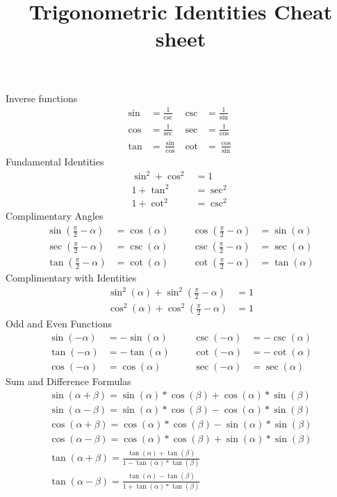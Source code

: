 \documentclass{article}
\title{\vspace{-5ex}Trigonometric Identities Cheat sheet  \vspace{-5ex}}
\author{}
\date{}
\newcommand{\nine}{\frac{\pi}{2}}
\renewcommand{\a}{\alpha}
\renewcommand{\b}{\beta}
\begin{document}
	\maketitle{}
	
	Inverse functions
	\begin{align*}
		\sin &= \frac{1}{\csc}  & \csc & = \frac{1}{\sin} \\
		\cos &= \frac{1}{\sec} & \sec & = \frac{1}{\cos} \\
		\tan &= \frac{\sin}{\cos}  & \cot & = \frac{\cos}{\sin}
	\end{align*}
	Fundamental Identities
	\begin{align*}
		\sin^2 + \cos^2 &= 1 \\
		1 + \tan^2 &= \sec^2 \\
		1 + \cot^2 &= \csc^2
	\end{align*}
	Complimentary Angles
	\begin{align*}
		\sin(\nine - \a) &= \cos(\a)  & & & \cos(\nine - \a) &= \sin(\a) \\
		\sec(\nine - \a) &= \csc(\a) & & & \csc(\nine - \a) &= \sec(\a) \\
		\tan(\nine - \a) &= \cot(\a) & & & \cot(\nine - \a) &= \tan(\a)
	\end{align*}
	Complimentary with Identities
	\begin{align*}
		\sin^2(\a) + \sin^2(\frac{\pi}{2} - \a) &= 1 \\
		\cos^2(\a) + \cos^2(\frac{\pi}{2} - \a) &= 1
	\end{align*}
	Odd and Even Functions
	\begin{align*}
		\sin(-\a) &= -\sin(\a)  & & & \csc(-\a) &= -\csc(\a) \\
		\tan(-\a) &= -\tan(\a) & & & \cot(-\a) &= -\cot(\a) \\
		\cos(-\a) &= \cos(\a) & & & \sec(-\a) &= \sec(\a)
	\end{align*}
	Sum and Difference Formulas
	\begin{align*}
		\sin(\a + \b) = \sin(\a) * \cos(\b) + \cos(\a) * \sin(\b) \\
		\sin(\a - \b) = \sin(\a)  * \cos(\b) - \cos(\a) * \sin(\b) \\
		\cos(\a + \b) = \cos(\a) * \cos(\b) - \sin(\a) * \sin(\b) \\
		\cos(\a - \b) = \cos(\a) * \cos(\b) + \sin(\a) * \sin(\b) \\
		\tan(\a + \b) = \frac{\tan(\a) + \tan(\b)}{1 - \tan(\a) * \tan(\b)} \\
		\tan(\a - \b) = \frac{\tan(\a) - \tan(\b)}{1 + \tan(\a) * \tan(\b)}
	\end{align*}
\end{document}
